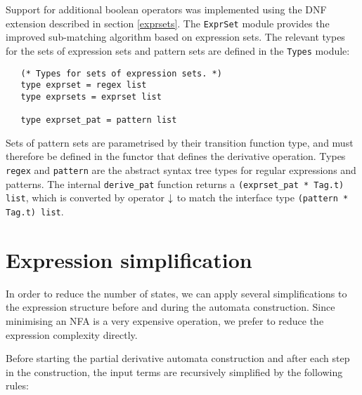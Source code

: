 Support for additional boolean operators was implemented using the DNF extension
described in section \ref{exprsets}.  The \texttt{ExprSet} module provides the
improved sub-matching algorithm based on expression sets.  The relevant types
for the sets of expression sets and pattern sets are defined in the
\texttt{Types} module:

\begin{lstlisting}
   (* Types for sets of expression sets. *)
   type exprset = regex list
   type exprsets = exprset list

   type exprset_pat = pattern list
\end{lstlisting}

Sets of pattern sets are parametrised by their transition function type, and
must therefore be defined in the functor that defines the derivative operation.
Types \texttt{regex} and \texttt{pattern} are the abstract syntax tree types for
regular expressions and patterns. The internal \texttt{derive\_pat} function
returns a \verb!(exprset_pat * Tag.t) list!, which is converted by operator
$\downarrow$ to match the interface type \verb!(pattern * Tag.t) list!.




\section{Expression simplification}

In order to reduce the number of states, we can apply several simplifications to
the expression structure before and during the automata construction. Since
minimising an NFA is a very expensive operation, we prefer to reduce the
expression complexity directly.

Before starting the partial derivative automata construction and after each step
in the construction, the input terms are recursively simplified by the following
rules:


